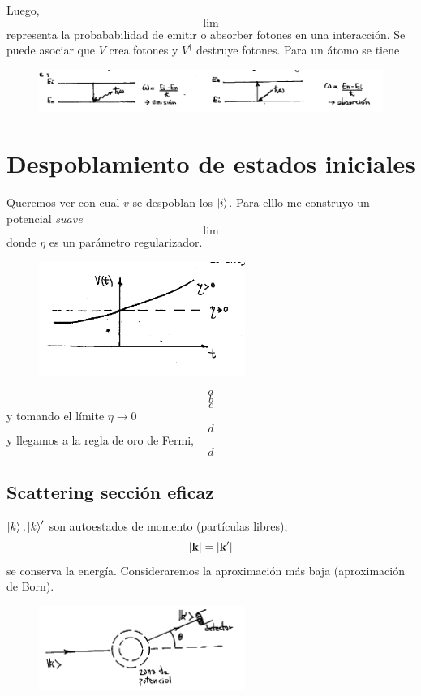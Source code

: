 \documentclass[10pt,oneside]{CBFT_book}
\begin{document}
Luego,
\[
	\lim 
\]
representa la probababilidad de emitir o absorber fotones en una interacción. Se puede asociar que $V$ crea 
fotones y $V^\dagger$ destruye fotones. Para un átomo se tiene 
\begin{figure}[htb]
	\begin{center}
	\includegraphics[width=1.0\textwidth]{images/teo2_26.pdf}
	\end{center}
	\caption{}
\end{figure} 




\section{Despoblamiento de estados iniciales}

Queremos ver con cual $v$ se despoblan los $\Ket{i}$. Para elllo me construyo un potencial {\it suave}
\[
	\lim 
\]
donde $\eta$ es un parámetro regularizador.
\begin{figure}[htb]
	\begin{center}
	\includegraphics[width=0.6\textwidth]{images/teo2_27.pdf}
	\end{center}
	\caption{}
\end{figure} 
\[
	a
\]
\[
	b
\]
\[
 	c
\]
y tomando el límite $\eta \to 0$ 
\[
	d
\]
y llegamos a la regla de oro de Fermi,
\[
	d
\]

\subsection{Scattering sección eficaz}

$\Ket{k},\Ket{k}'$ son autoestados de momento (partículas libres),
\[
	|\vb{k}| = |\vb{k}'| 
\]
se conserva la energía. Consideraremos la aproximación más baja (aproximación de Born).
\begin{figure}[htb]
	\begin{center}
	\includegraphics[width=0.6\textwidth]{images/teo2_28.pdf}
	\end{center}
	\caption{}
\end{figure} 
\end{document}
